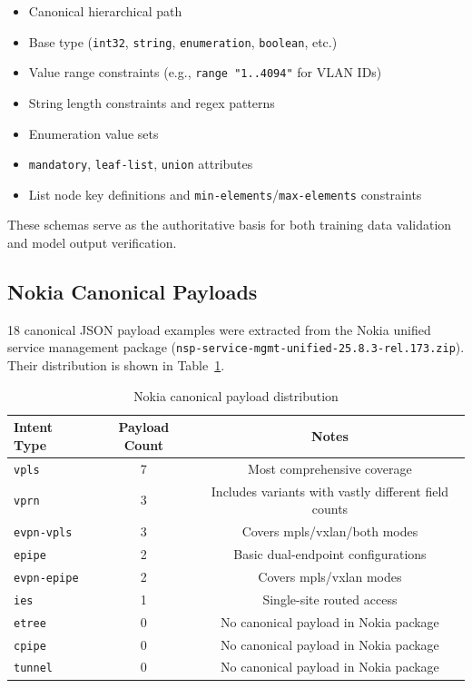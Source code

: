 \documentclass[12pt, a4paper]{article}
\newcommand{\intenttype}[1]{\texttt{#1}}
\begin{document}
\begin{itemize}
  \item Canonical hierarchical path
  \item Base type (\texttt{int32}, \texttt{string}, \texttt{enumeration}, \texttt{boolean}, etc.)
  \item Value range constraints (e.g., \texttt{range "1..4094"} for VLAN IDs)
  \item String length constraints and regex patterns
  \item Enumeration value sets
  \item \texttt{mandatory}, \texttt{leaf-list}, \texttt{union} attributes
  \item List node key definitions and \texttt{min-elements}/\texttt{max-elements} constraints
\end{itemize}

\noindent
These schemas serve as the authoritative basis for both training data validation and model output verification.

\subsection{Nokia Canonical Payloads}

18 canonical JSON payload examples were extracted from the Nokia unified service management package (\texttt{nsp-service-mgmt-unified-25.8.3-rel.173.zip}). Their distribution is shown in Table~\ref{tab:canonical-payloads}.

\begin{table}[H]
\centering
\caption{Nokia canonical payload distribution}
\label{tab:canonical-payloads}
\small
\begin{tabular}{lcc}
\toprule
\textbf{Intent Type} & \textbf{Payload Count} & \textbf{Notes} \\
\midrule
\intenttype{vpls}        & 7 & Most comprehensive coverage \\
\intenttype{vprn}        & 3 & Includes variants with vastly different field counts \\
\intenttype{evpn-vpls}   & 3 & Covers mpls/vxlan/both modes \\
\intenttype{epipe}       & 2 & Basic dual-endpoint configurations \\
\intenttype{evpn-epipe}  & 2 & Covers mpls/vxlan modes \\
\intenttype{ies}         & 1 & Single-site routed access \\
\midrule
\intenttype{etree}       & 0 & No canonical payload in Nokia package \\
\intenttype{cpipe}       & 0 & No canonical payload in Nokia package \\
\intenttype{tunnel}      & 0 & No canonical payload in Nokia package \\
\bottomrule
\end{tabular}
\end{table}
\end{document}
